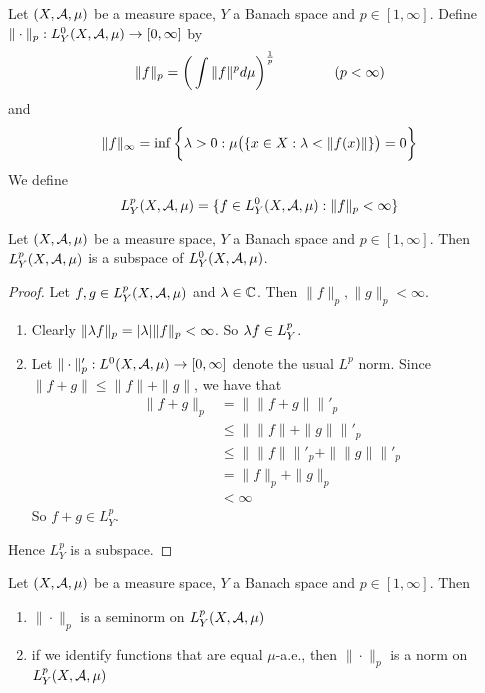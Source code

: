 \documentclass{book}
\begin{document}
	\begin{defn}  
		Let $(X, \mathcal{A}, \mu)$ be a measure space, $Y$ a Banach space and $p \in [1, \infty]$. Define $  \| \cdot \|_p : L_Y^0(X, \mathcal{A}, \mu) \rightarrow [0, \infty]$ by $$\|f \|_p = \bigg(\int  \|f\|^p d\mu \bigg)^{\frac{1}{p}} \hspace{1.5cm}( p < \infty)$$ 
		and 
		$$\|f \|_{\infty} = \inf \bigg \{\lambda >0: \mu\big(\{x \in X: \lambda < \|f(x)\|  \}\big) = 0 \bigg \} $$
		We define $$L_Y^p(X, \mathcal{A}, \mu) =  \{f \in L_Y^0(X, \mathcal{A}, \mu): \|f \|_p < \infty \}$$
	\end{defn}	
	
	\begin{ex}  
	Let $(X, \mathcal{A}, \mu)$ be a measure space, $Y$ a Banach space and $p \in [1, \infty]$. Then $L_Y^p(X, \mathcal{A}, \mu)$ is a subspace of $L_Y^0(X, \mathcal{A}, \mu)$. 
	\end{ex}
	
	\begin{proof}Let $f, g \in L^p_Y(X, \mathcal{A}, \mu)$ and $\lambda \in \mathbb{C}$. Then $\|f\|_p, \|g\|_p < \infty$.
	\begin{enumerate}
	\item Clearly $\|\lambda f\|_p = |\lambda|\|f\|_p < \infty$.
	So $\lambda f \in L^p_Y$.
	\item Let $\|\cdot \|'_p: L^0(X, \mathcal{A}, \mu) \rightarrow [0,\infty]$ denote the usual $L^p$ norm. Since $\|f + g\| \leq \|f\| + \|g\|$, we have that 
	\begin{align*}
	\|f+g\|_p 
	&= \| \|f+g\| \|'_p \\
	& \leq \|\|f\| + \|g\| \|'_p \\
	& \leq  \|\|f\| \|'_p + \|\|g\| \|'_p \\
	&= \|f \|_p + \|g\|_p \\
	& < \infty
\end{align*}	
So $f+g \in L^p_Y$.
	\end{enumerate}
	Hence $L^p_Y$ is a subspace.
	\end{proof}
	
	\begin{ex}  
	Let $(X, \mathcal{A}, \mu)$ be a measure space, $Y$ a Banach space and $p \in [1, \infty]$. Then 
	\begin{enumerate}
	\item $\|\cdot\|_p$ is a seminorm on $L^p_Y(X, \mathcal{A}, \mu)$
	\item if we identify functions that are equal $\mu$-a.e., then $\|\cdot\|_p$ is a norm on $L^p_Y(X, \mathcal{A}, \mu)$
	\end{enumerate}
	\end{ex}
	
\end{document}
